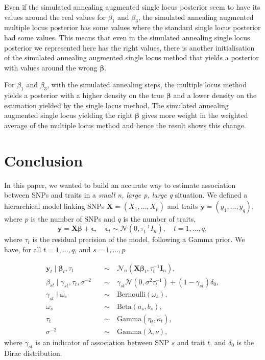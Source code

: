 \documentclass[a4paper, 11pt]{report}
\numberwithin{equation}{chapter}
\begin{document}
Even if the simulated annealing augmented single locus posterior seem to have its values around the real values for $\beta_1$ and $\beta_3$, the simulated annealing augmented multiple locus posterior has some values where the standard single locus posterior had some values. This  means that even in the simulated annealing single locus posterior we represented here has the right values, there is another initialisation of the simulated annealing augmented single locus method that yields a posterior with values around the wrong $\boldsymbol{\beta}$.

For $\beta_1$ and $\beta_3$, with the simulated annealing steps, the multiple locus method yields a posterior with a higher density on the true $\boldsymbol{\beta}$ and a lower density on the estimation yielded by the single locus method. The simulated annealing augmented single locus yielding the right $\boldsymbol{\beta}$ gives more weight in the weighted average of the multiple locus method and hence the result shows this change.
%
%
%
%
%
%
\newpage
\chapter{Conclusion}
In this paper, we wanted to build an accurate way to estimate association between SNPs and traits in a \textit{small n, large p, large q} situation. We defined a hierarchical model linking SNPs $\boldsymbol{X} = (X_1,\dots,X_p)$ and traits $\boldsymbol{y} = (y_1, \dots, y_q)$, where $p$ is the number of SNPs and $q$ is the number of traits,
$$
\boldsymbol{y} = \boldsymbol{X\beta} + \boldsymbol{\epsilon},\quad \boldsymbol{\epsilon}_t \sim \mathcal{N}\left(0,\tau_t^{-1}I_n\right), \quad t=1,\dots,q,
$$
where $\tau_t$ is the residual precision of the model, following a Gamma prior. We have, for all $t = 1,\dots, q$, and $s=1,\dots,p$

\begin{align*}
\boldsymbol{y}_t \mid \boldsymbol{\beta}_t,\tau_t \quad &\sim \quad \mathcal{N}_n\left(\boldsymbol{X}\boldsymbol{\beta}_t,\tau_t^{-1}\boldsymbol{I}_n\right),\\
\beta_{st} \mid \gamma_{st},\tau_t,\sigma^{-2} \quad &\sim \quad \gamma_{st}\mathcal{N}\left(0,\sigma^2\tau_t^{-1}\right)+(1-\gamma_{st})\delta_0,\\
\gamma_{st} \mid \omega_s \quad &\sim \quad \mathrm{Bernoulli}(\omega_s),\\
\omega_s \quad &\sim \quad \mathrm{Beta}(a_s,b_s),\\
\tau_t \quad &\sim \quad \mathrm{Gamma}(\eta_t,\kappa_t),\\
\sigma^{-2} \quad &\sim \quad \mathrm{Gamma}(\lambda, \nu),
\end{align*}
where $\gamma_{st}$ is an indicator of association between SNP $s$ and trait $t$, and $\delta_0$ is the Dirac distribution.
\end{document}

